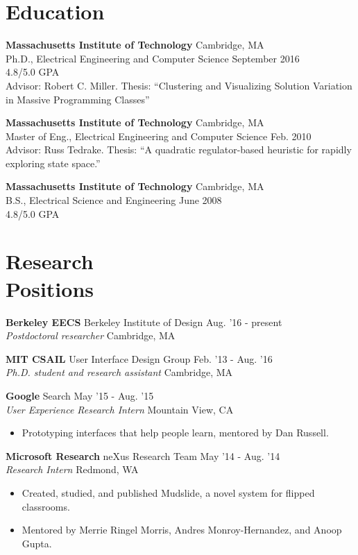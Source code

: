 \documentclass[margin]{res}
\begin{document}
\begin{resume}

\section{Education} 
{\bf Massachusetts Institute of Technology} \hfill Cambridge, MA \\
Ph.D., Electrical Engineering and Computer Science \hfill September 2016\\
4.8/5.0 GPA \\
Advisor: Robert C. Miller. Thesis: ``Clustering and Visualizing Solution Variation in Massive Programming Classes''

{\bf Massachusetts Institute of Technology} \hfill Cambridge, MA \\
Master of Eng., Electrical Engineering and Computer Science \hfill Feb. 2010 \\
Advisor: Russ Tedrake. Thesis: ``A quadratic regulator-based heuristic for rapidly exploring state space.''

{\bf Massachusetts Institute of Technology} \hfill Cambridge, MA \\
B.S., Electrical Science and Engineering \hfill June 2008 \\
4.8/5.0 GPA

\section{Research \\Positions}

{\bf Berkeley EECS} Berkeley Institute of Design \hfill Aug. '16 - present \\ 
{\it Postdoctoral researcher} \hfill Cambridge, MA 

{\bf MIT CSAIL} User Interface Design Group \hfill Feb. '13 - Aug. '16 \\ 
{\it Ph.D. student and research assistant} \hfill Cambridge, MA 

{\bf Google} Search \hfill May '15 - Aug. '15 \\ {\it User Experience Research Intern} \hfill Mountain View, CA 
 \begin{itemize} \itemsep -2pt  %
 \item Prototyping interfaces that help people learn, mentored by Dan Russell. 
\end{itemize}

{\bf Microsoft Research} neXus Research Team \hfill May '14 - Aug. '14 \\ {\it Research Intern} \hfill Redmond, WA 
 \begin{itemize} \itemsep -2pt  %
 \item Created, studied, and published Mudslide, a novel system for flipped classrooms.
\item Mentored by Merrie Ringel Morris, Andres Monroy-Hernandez, and Anoop Gupta. 
\end{itemize}


\end{resume}
\end{document}
